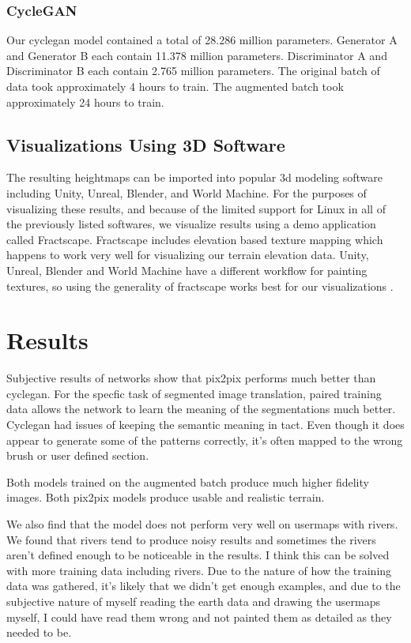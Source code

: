 \documentclass[twocolumn]{article}
\begin{document}
	\subsubsection{CycleGAN}
		Our cyclegan model contained a total of 28.286 million parameters. Generator A and Generator B each contain 11.378 million parameters. Discriminator A and Discriminator B each contain 2.765 million parameters. The original batch of data took approximately 4 hours to train. The augmented batch took approximately 24 hours to train.

	\subsection{Visualizations Using 3D Software}
	
	The resulting heightmaps can be imported into popular 3d modeling software including Unity, Unreal, Blender, and World Machine. For the purposes of visualizing these results, and because of the limited support for Linux in all of the previously listed softwares, we visualize results using a demo application called Fractscape. Fractscape includes elevation based texture mapping which happens to work very well for visualizing our terrain elevation data. Unity, Unreal, Blender and World Machine have a different workflow for painting textures, so using the generality of fractscape works best for our visualizations \cite{starscenesoftware2006}.

	\section{Results}
	
	Subjective results of networks show that pix2pix performs much better than cyclegan. For the specfic task of segmented image translation, paired training data allows the network to learn the meaning of the segmentations much better. Cyclegan had issues of keeping the semantic meaning in tact. Even though it does appear to generate some of the patterns correctly, it's often mapped to the wrong brush or user defined section.
	
	Both models trained on the augmented batch produce much higher fidelity images. Both pix2pix models produce usable and realistic terrain.
	
	We also find that the model does not perform very well on usermaps with rivers. We found that rivers tend to produce noisy results and sometimes the rivers aren't defined enough to be noticeable in the results. I think this can be solved with more training data including rivers. Due to the nature of how the training data was gathered, it's likely that we didn't get enough examples, and due to the subjective nature of myself reading the earth data and drawing the usermaps myself, I could have read them wrong and not painted them as detailed as they needed to be.
\end{document}
